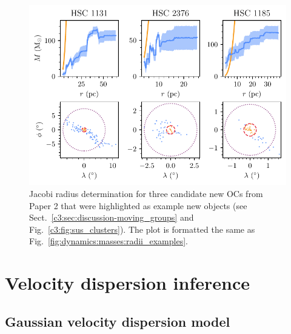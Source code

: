 \begin{figure}[t]
    \centering
    \includegraphics[width=\textwidth]{fig/c4/masses_jacobi_determination.pdf}
    \caption[Jacobi radius determination for three candidate new OCs from Paper 2 that were highlighted as example new objects]{Jacobi radius determination for three candidate new OCs from Paper 2 that were highlighted as example new objects (see Sect.~\ref{c3:sec:discussion-moving_groups} and Fig.~\ref{c3:fig:sus_clusters}). The plot is formatted the same as Fig.~\ref{fig:dynamics:masses:radii_examples}.}
    \label{fig:dynamics:masses:radii_examples_sus}
\end{figure}



\section{Velocity dispersion inference}
\label{sec:dynamics:velocities}


\subsection{Gaussian velocity dispersion model}
\label{sec:dynamics:velocities:model}

